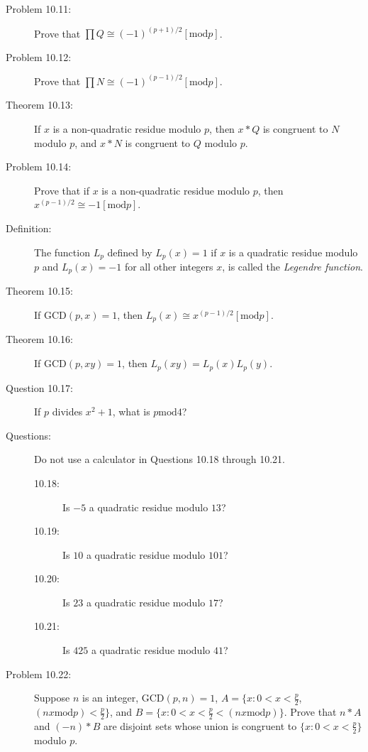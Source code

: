 \documentclass{article}
\begin{document}
\begin{description}
  \item[Problem 10.11:] Prove that $\prod Q \cong (-1)^{(p+1)/2} [\text{mod} p]$.

  \item[Problem 10.12:] Prove that $\prod N \cong (-1)^{(p-1)/2} [\text{mod} p]$.

  \item[Theorem 10.13:] If $x$ is a non-quadratic residue modulo $p$, then $x*Q$ is congruent to $N$ modulo $p$, and $x*N$ is congruent to $Q$ modulo $p$.

  \item[Problem 10.14:] Prove that if $x$ is a non-quadratic residue modulo $p$, then $x^{(p-1)/2} \cong -1 [\text{mod} p]$.

  \item[Definition:] The function $L_p$ defined by $L_p(x)=1$ if $x$ is a quadratic residue modulo $p$ and $L_p(x)=-1$ for all other integers $x$, is called the \emph{Legendre function}.

  \item[Theorem 10.15:] If $\text{GCD}(p,x)=1$, then $L_p(x) \cong x^{(p-1)/2} [\text{mod} p]$.

  \item[Theorem 10.16:] If $\text{GCD}(p,xy)=1$, then $L_p(xy) = L_p(x) L_p(y)$.

  \item[Question 10.17:] If $p$ divides $x^2+1$, what is $p \text{mod} 4$?

  \item[Questions:] Do not use a calculator in Questions 10.18 through 10.21.
    \begin{description}
      \item[10.18:] Is $-5$ a quadratic residue modulo $13$?
      \item[10.19:] Is $10$ a quadratic residue modulo $101$?
      \item[10.20:] Is $23$ a quadratic residue modulo $17$?
      \item[10.21:] Is $425$ a quadratic residue modulo $41$?
    \end{description}

  \item[Problem 10.22:] Suppose $n$ is an integer, $\text{GCD}(p,n)=1$, $A= \{ x: 0<x< \frac{p}{2}$, $(nx \text{mod} p) < \frac{p}{2} \}$, and $B= \{ x: 0 < x < \frac{p}{2} < (nx \text{mod} p) \}$. Prove that $n*A$ and $(-n)*B$ are disjoint sets whose union is congruent to $\{ x: 0<x< \frac{p}{2} \}$ modulo $p$.


\end{description}
\end{document}

